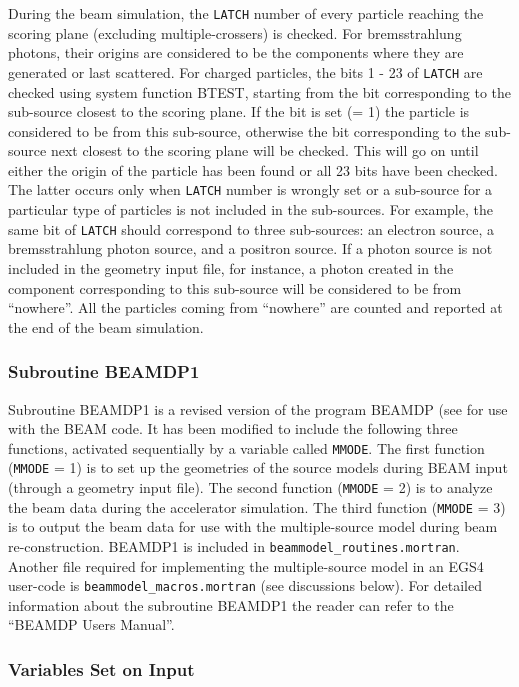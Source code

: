 \documentclass[12pt,twoside]{article}
\begin{document}
During the beam simulation, the {\tt LATCH} number of every particle reaching
the scoring plane (excluding multiple-crossers) is checked. For
bremsstrahlung photons, their origins are considered to be the components
where they are generated or last scattered. For charged particles, the
bits 1 - 23 of {\tt LATCH} are checked using system function BTEST, starting
from the bit corresponding to the sub-source closest to the scoring plane.
If the bit is set (= 1) the particle is considered to be from this
sub-source, otherwise the bit corresponding to the sub-source next closest
to the scoring plane will be checked. This will go on until either the
origin of the particle has been found or all 23 bits have been
checked. The latter occurs only when {\tt LATCH} number is wrongly set or a
sub-source for a particular type of particles is not included in the
sub-sources. For example, the same bit of {\tt LATCH} should correspond to three
sub-sources: an electron source, a bremsstrahlung photon source, and a
positron source. If a photon source is not included in the geometry input
file, for instance, a photon created in the component corresponding to
this sub-source will be considered to be from ``nowhere''.  All the
particles coming from ``nowhere'' are counted and reported at the end of
the beam simulation.

\subsubsection{Subroutine BEAMDP1}

Subroutine BEAMDP1 is a revised version of the program BEAMDP (see
\cite{MR95a} for use with the BEAM code. It has been modified to include
the following three functions, activated sequentially by a variable called
{\tt MMODE}. The first function ({\tt MMODE} = 1) is to set up the geometries of the
source models during BEAM input (through a geometry input file). The
second function ({\tt MMODE} = 2) is to analyze the beam data during the
accelerator simulation. The third function ({\tt MMODE} = 3) is to output the
beam data for use with the multiple-source model during beam
re-construction. BEAMDP1 is included in {\tt beammodel\_routines.mortran}.
Another file required for implementing the multiple-source model in an
EGS4 user-code is {\tt beammodel\_macros.mortran} (see discussions below).
For detailed information about the subroutine BEAMDP1 the reader can refer
to the ``BEAMDP Users Manual''\cite{MR95a}.

\subsubsection{Variables Set on Input}
\end{document}
